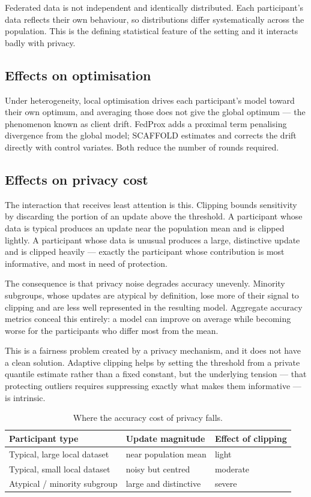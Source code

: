 \documentclass[11pt,a4paper]{article}
\begin{document}
Federated data is not independent and identically distributed. Each
participant's data reflects their own behaviour, so distributions differ
systematically across the population. This is the defining statistical feature
of the setting and it interacts badly with privacy.

\subsection{Effects on optimisation}

Under heterogeneity, local optimisation drives each participant's model toward
their own optimum, and averaging those does not give the global optimum ---
the phenomenon known as client drift. FedProx \cite{li2020} adds a proximal
term penalising divergence from the global model; SCAFFOLD
\cite{karimireddy2020} estimates and corrects the drift directly with control
variates. Both reduce the number of rounds required.

\subsection{Effects on privacy cost}

The interaction that receives least attention is this. Clipping bounds
sensitivity by discarding the portion of an update above the threshold. A
participant whose data is typical produces an update near the population mean
and is clipped lightly. A participant whose data is unusual produces a large,
distinctive update and is clipped heavily --- exactly the participant whose
contribution is most informative, and most in need of protection.

The consequence is that privacy noise degrades accuracy unevenly. Minority
subgroups, whose updates are atypical by definition, lose more of their signal
to clipping and are less well represented in the resulting model. Aggregate
accuracy metrics conceal this entirely: a model can improve on average while
becoming worse for the participants who differ most from the mean.

This is a fairness problem created by a privacy mechanism, and it does not
have a clean solution. Adaptive clipping helps by setting the threshold from a
private quantile estimate rather than a fixed constant, but the underlying
tension --- that protecting outliers requires suppressing exactly what makes
them informative --- is intrinsic.

\begin{table}[htbp]
  \centering
  \caption{Where the accuracy cost of privacy falls.}
  \label{tab:fairness}
  \begin{tabular}{lll}
    \toprule
    \textbf{Participant type} & \textbf{Update magnitude} & \textbf{Effect of clipping} \\
    \midrule
    Typical, large local dataset & near population mean & light \\
    Typical, small local dataset & noisy but centred    & moderate \\
    Atypical / minority subgroup & large and distinctive & severe \\
    \bottomrule
  \end{tabular}
\end{table}
\end{document}
